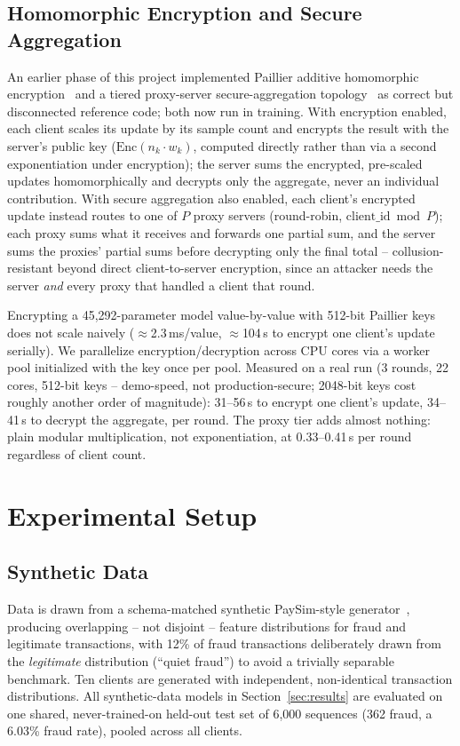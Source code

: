 \documentclass[12pt]{svproc}
\begin{document}
\subsection{Homomorphic Encryption and Secure Aggregation}
\label{sec:he}
An earlier phase of this project implemented Paillier additive
homomorphic encryption~\cite{paillier1999} and a tiered proxy-server
secure-aggregation topology~\cite{bonawitz2017secagg} as correct but
disconnected reference code; both now run in training. With encryption
enabled, each client scales its update by its sample count and encrypts
the result with the server's public key ($\mathrm{Enc}(n_k \cdot w_k)$,
computed directly rather than via a second exponentiation under
encryption); the server sums the encrypted, pre-scaled updates
homomorphically and decrypts only the aggregate, never an individual
contribution. With secure aggregation also enabled, each client's
encrypted update instead routes to one of $P$ proxy servers
(round-robin, $\mathrm{client\_id} \bmod P$); each proxy sums what it
receives and forwards one partial sum, and the server sums the proxies'
partial sums before decrypting only the final total -- collusion-resistant
beyond direct client-to-server encryption, since an attacker needs the
server \emph{and} every proxy that handled a client that round.

Encrypting a 45{,}292-parameter model value-by-value with 512-bit
Paillier keys does not scale naively ($\approx$2.3\,ms/value,
$\approx$104\,s to encrypt one client's update serially). We
parallelize encryption/decryption across CPU cores via a worker pool
initialized with the key once per pool. Measured on a real run (3
rounds, 22 cores, 512-bit keys -- demo-speed, not production-secure;
2048-bit keys cost roughly another order of magnitude): 31--56\,s to
encrypt one client's update, 34--41\,s to decrypt the aggregate, per
round. The proxy tier adds almost nothing: plain modular
multiplication, not exponentiation, at 0.33--0.41\,s per round
regardless of client count.

\section{Experimental Setup}
\label{sec:setup}

\subsection{Synthetic Data}
Data is drawn from a schema-matched synthetic PaySim-style
generator~\cite{lopezrojas2016paysim}, producing overlapping -- not
disjoint -- feature distributions for fraud and legitimate transactions,
with 12\% of fraud transactions deliberately drawn from the
\emph{legitimate} distribution (``quiet fraud'') to avoid a trivially
separable benchmark. Ten clients are generated with independent,
non-identical transaction distributions. All synthetic-data models in
Section~\ref{sec:results} are evaluated on one shared, never-trained-on
held-out test set of 6{,}000 sequences (362 fraud, a 6.03\% fraud rate),
pooled across all clients.
\end{document}
